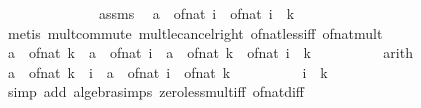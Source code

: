 \begin{isabellebody}
\ \ \ \ \isamarkupfalse%
\ {\isacharminus}{\kern0pt}\isanewline
\ \ \ \ \ \ \isamarkupfalse%
\ assms\ \isamarkupfalse%
\ {\isachardoublequoteopen}a\ {\isacharasterisk}{\kern0pt}\ of{\isacharunderscore}{\kern0pt}nat\ i\ {\isasymge}\ of{\isacharunderscore}{\kern0pt}nat\ {\isacharparenleft}{\kern0pt}i\ {\isacharasterisk}{\kern0pt}\ k{\isacharparenright}{\kern0pt}{\isachardoublequoteclose}\isanewline
\ \ \ \ \ \ \ \ \isamarkupfalse%
\ {\isacharparenleft}{\kern0pt}metis\ mult{\isachardot}{\kern0pt}commute\ mult{\isacharunderscore}{\kern0pt}le{\isacharunderscore}{\kern0pt}cancel{\isacharunderscore}{\kern0pt}right\ of{\isacharunderscore}{\kern0pt}nat{\isacharunderscore}{\kern0pt}less{\isacharunderscore}{\kern0pt}{}{\isacharunderscore}{\kern0pt}iff\ of{\isacharunderscore}{\kern0pt}nat{\isacharunderscore}{\kern0pt}mult{\isacharparenright}{\kern0pt}\isanewline
\ \ \ \ \ \ \isamarkupfalse%
\ \isamarkupfalse%
\ {\isachardoublequoteopen}a\ {\isacharasterisk}{\kern0pt}\ of{\isacharunderscore}{\kern0pt}nat\ k\ {\isacharminus}{\kern0pt}\ a\ {\isacharasterisk}{\kern0pt}\ of{\isacharunderscore}{\kern0pt}nat\ i\ {\isasymle}\ a\ {\isacharasterisk}{\kern0pt}\ of{\isacharunderscore}{\kern0pt}nat\ k\ {\isacharminus}{\kern0pt}\ of{\isacharunderscore}{\kern0pt}nat\ {\isacharparenleft}{\kern0pt}i\ {\isacharasterisk}{\kern0pt}\ k{\isacharparenright}{\kern0pt}{\isachardoublequoteclose}\isanewline
\ \ \ \ \ \ \ \ \isamarkupfalse%
\ arith\isanewline
\ \ \ \ \ \ \isamarkupfalse%
\ \isamarkupfalse%
\ {\isachardoublequoteopen}a\ {\isacharasterisk}{\kern0pt}\ of{\isacharunderscore}{\kern0pt}nat\ {\isacharparenleft}{\kern0pt}k\ {\isacharminus}{\kern0pt}\ i{\isacharparenright}{\kern0pt}\ {\isasymle}\ {\isacharparenleft}{\kern0pt}a\ {\isacharminus}{\kern0pt}\ of{\isacharunderscore}{\kern0pt}nat\ i{\isacharparenright}{\kern0pt}\ {\isacharasterisk}{\kern0pt}\ of{\isacharunderscore}{\kern0pt}nat\ k{\isachardoublequoteclose}\isanewline
\ \ \ \ \ \ \ \ \isamarkupfalse%
\ {\isacartoucheopen}i\ {\isacharless}{\kern0pt}\ k{\isacartoucheclose}\ \isamarkupfalse%
\ {\isacharparenleft}{\kern0pt}simp\ add{\isacharcolon}{\kern0pt}\ algebra{\isacharunderscore}{\kern0pt}simps\ zero{\isacharunderscore}{\kern0pt}less{\isacharunderscore}{\kern0pt}mult{\isacharunderscore}{\kern0pt}iff\ of{\isacharunderscore}{\kern0pt}nat{\isacharunderscore}{\kern0pt}diff{\isacharparenright}{\kern0pt}\isanewline
\ \ \ \ \ \ \isamarkupfalse%

\end{isabellebody}
